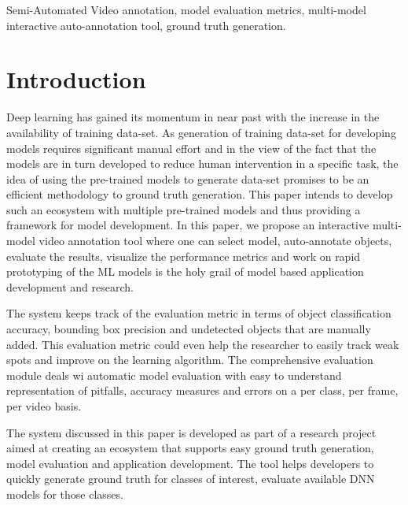 \documentclass[conference]{IEEEtran}
\begin{document}
\begin{IEEEkeywords}
Semi-Automated Video annotation, model evaluation metrics, multi-model interactive auto-annotation tool, ground truth generation.
\end{IEEEkeywords}

%
\IEEEpeerreviewmaketitle


\section{Introduction}
Deep learning has gained its momentum in near past with the increase in the availability of training data-set. As generation of training data-set for developing models requires significant manual effort and in the view of the fact that the models are in turn developed to reduce human intervention in a specific task, the idea of using the pre-trained models to generate data-set promises to be an efficient methodology to ground truth generation. This paper intends to develop such an ecosystem with multiple pre-trained models and thus providing a framework for model development. In this paper, we propose an interactive multi-model video annotation tool where one can select model, auto-annotate objects, evaluate the results, visualize the performance metrics and work on rapid prototyping of the ML models is the holy grail of model based application development and research.\par
The system keeps track of the evaluation metric in terms of object classification accuracy, bounding box precision and undetected objects that are manually added. This evaluation metric could even help the researcher to easily track weak spots and improve on the learning algorithm. The comprehensive evaluation module deals wi automatic model evaluation with easy to understand representation of pitfalls, accuracy measures and errors on a per class, per frame, per video basis. \par
The system discussed in this paper is developed as part of a research project aimed at creating an ecosystem that supports easy ground truth generation, model evaluation and application development. The tool helps developers to quickly generate ground truth for classes of interest, evaluate available DNN models for those classes. \par
\end{document}
